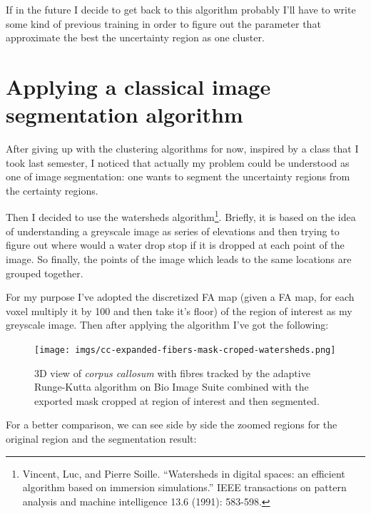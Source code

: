\documentclass[a4paper,11pt]{report}
\begin{document}
  If in the future I decide to get back to this algorithm probably I'll have to write some kind of previous training in order to figure out the parameter that approximate the best the uncertainty region as one cluster.

  \section{Applying a classical image segmentation algorithm}
  After giving up with the clustering algorithms for now, inspired by a class that I took last semester, I noticed that actually my problem could be understood as one of image segmentation: one wants to segment the uncertainty regions from the certainty regions.

  Then I decided to use the watersheds algorithm\footnote{Vincent, Luc, and Pierre Soille. ``Watersheds in digital spaces: an efficient algorithm based on immersion simulations.'' IEEE transactions on pattern analysis and machine intelligence 13.6 (1991): 583-598.}. Briefly, it is based on the idea of understanding a greyscale image as series of elevations and then trying to figure out where would a water drop stop if it is dropped at each point of the image. So finally, the points of the image which leads to the same locations are grouped together.

  For my purpose I've adopted the discretized FA map (given a FA map, for each voxel multiply it by 100 and then take it's floor) of the region of interest as my greyscale image. Then after applying the algorithm I've got the following:

  \begin{figure}[H]
    \texttt{[image: imgs/cc-expanded-fibers-mask-croped-watersheds.png]}
    \caption{3D view of \textit{corpus callosum} with fibres tracked by the adaptive Runge-Kutta algorithm on Bio Image Suite combined with the exported mask cropped at region of interest and then segmented.}
    \label{fig:fibres-mask-croped-segmented}
  \end{figure}

  For a better comparison, we can see side by side the zoomed regions for the original region and the segmentation result:
\end{document}
